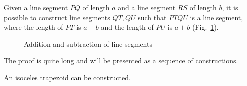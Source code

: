 \begin{theorem}\label{thm.add-subtract-mm}
Given a line segment $\overline{PQ}$ of length $a$ and a line segment $\overline{RS}$ of length $b$, it is possible to construct line segments $\overline{QT}, \overline{QU}$ such that $\overline{PTQU}$ is a line segment, where the length of $\overline{PT}$ is $a-b$ and the length of $\overline{PU}$ is $a+b$ (Fig.~\ref{f.compass-add1}).
\end{theorem}
\begin{figure}[ht]
\begin{center}
\end{center}
\caption{Addition and subtraction of line segments}\label{f.compass-add1}
\end{figure}

The proof is quite long and will be presented as a sequence of constructions.

\begin{theorem}\label{thm.compass-trapezoid}
An isoceles trapezoid can be constructed.
\end{theorem}

